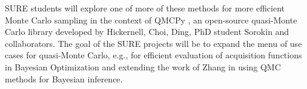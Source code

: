 SURE students will explore one of more of these methods for more efficient Monte Carlo sampling in the context of QMCPy \cite{QMCPy2020a,QMCBlog}, an open-source quasi-Monte Carlo library developed by Hickernell, Choi, Ding, PhD student Sorokin and collaborators. The goal of the SURE projects will be to expand the menu of use cases for quasi-Monte Carlo, e.g., for efficient evaluation of acquisition functions in Bayesian Optimization and extending the work of Zhang \cite{Zha21a} in using QMC methods for Bayesian inference. 